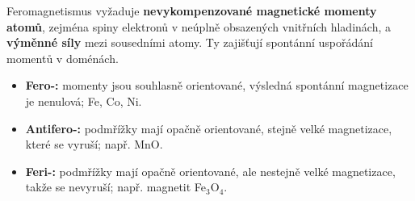 Feromagnetismus vyžaduje \textbf{nevykompenzované magnetické momenty atomů}, zejména spiny elektronů v neúplně obsazených vnitřních hladinách, a \textbf{výměnné síly} mezi sousedními atomy. Ty zajišťují spontánní uspořádání momentů v doménách.
\begin{itemize}
\item \textbf{Fero-:} momenty jsou souhlasně orientované, výsledná spontánní magnetizace je nenulová; Fe, Co, Ni.
\item \textbf{Antifero-:} podmřížky mají opačně orientované, stejně velké magnetizace, které se vyruší; např. MnO.
\item \textbf{Feri-:} podmřížky mají opačně orientované, ale nestejně velké magnetizace, takže se nevyruší; např. magnetit Fe$_3$O$_4$.
\end{itemize}
